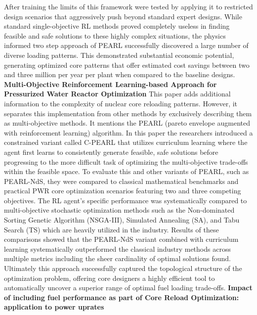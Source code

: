 \documentclass{article}
\begin{document}
\newline
After training the limits of this framework were tested by applying it to restricted design scenarios that aggressively push beyond standard expert designs. While standard single-objective RL methods proved completely useless in finding feasible and safe solutions to these highly complex situations, the physics informed two step approach of PEARL successfully discovered a large number of diverse loading patterns. This demonstrated substantial economic potential, generating optimized core patterns that offer estimated cost savings between two and three million per year per plant when compared to the baseline designs.
\newline
\textbf{Multi-Objective Reinforcement Learning-based Approach for Pressurized Water Reactor Optimization}
\newline
This paper adds additional information to the complexity of nuclear core reloading patterns. However, it separates this implementation from other methods by exclusively describing them as multi-objective methods. It mentions the PEARL (pareto envelope augmented with reinforcement learning) algorithm. In this paper the researchers introduced a constrained variant called C-PEARL that utilizes curriculum learning where the agent first learns to consistently generate feasible, safe solutions before progressing to the more difficult task of optimizing the multi-objective trade-offs within the feasible space.
\newline 
To evaluate this and other variants of PEARL, such as PEARL-NdS, they were compared to classical mathematical benchmarks and practical PWR core optimization scenarios featuring two and three competing objectives. The RL agent’s specific performance was systematically compared to multi-objective stochastic optimization methods such as the Non-dominated Sorting Genetic Algorithm (NSGA-III), Simulated Annealing (SA), and Tabu Search (TS) which are heavily utilized in the industry.  Results of these comparisons showed that the PEARL-NdS variant combined with curriculum learning systematically outperformed the classical industry methods across multiple metrics including the sheer cardinality of optimal solutions found. Ultimately this approach successfully captured the topological structure of the optimization problem, offering core designers a highly efficient tool to automatically uncover a superior range of optimal fuel loading trade-offs.
\newline 
\newline\textbf{Impact of including fuel performance as part of Core Reload Optimization: application to power uprates}
\end{document}
